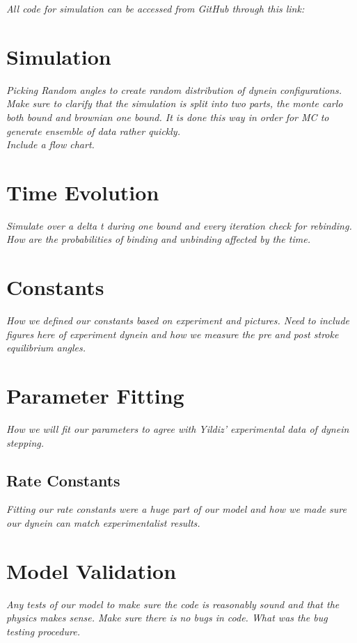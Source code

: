 \textit{All code for simulation can be accessed from GitHub through this link:}


\section{Simulation}
\textit{Picking Random angles to create random distribution of dynein configurations. Make sure to clarify that the simulation is split into two parts, the monte carlo both bound and brownian one bound. It is done this way in order for MC to generate ensemble of data rather quickly.}\\
\textit{Include a flow chart.}



\section{Time Evolution}
\textit{Simulate over a delta t during one bound and every iteration check for rebinding. How are the probabilities of binding and unbinding affected by the time.}

\section{Constants}
\textit{How we defined our constants based on experiment and pictures.  Need to include figures here of experiment dynein and how we measure the pre and post stroke equilibrium angles.}

\section{Parameter Fitting}
\textit{How we will fit our parameters to agree with Yildiz' experimental data of dynein stepping.}

\subsection{Rate Constants}
\textit{Fitting our rate constants were a huge part of our model and how we made sure our dynein can match experimentalist results.}

\section{Model Validation}
\textit{Any tests of our model to make sure the code is reasonably sound and that the physics makes sense. Make sure there is no bugs in code. What was the bug testing procedure.}
